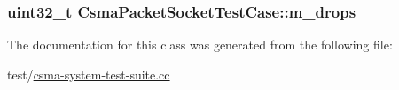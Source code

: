 \subsubsection[{\texorpdfstring{m\+\_\+drops}{m_drops}}]{\setlength{\rightskip}{0pt plus 5cm}uint32\+\_\+t Csma\+Packet\+Socket\+Test\+Case\+::m\+\_\+drops\hspace{0.3cm}{\ttfamily [private]}}\hypertarget{classCsmaPacketSocketTestCase_aa6b5ea183a0d1697a9ea4ed24d17c1a7}{}\label{classCsmaPacketSocketTestCase_aa6b5ea183a0d1697a9ea4ed24d17c1a7}


The documentation for this class was generated from the following file\+:\begin{DoxyCompactItemize}
\item 
test/\hyperlink{csma-system-test-suite_8cc}{csma-\/system-\/test-\/suite.\+cc}\end{DoxyCompactItemize}
